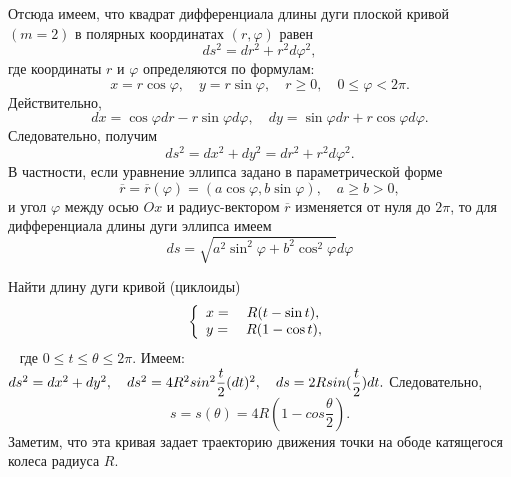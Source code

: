 Отсюда имеем, что квадрат дифференциала длины дуги плоской кривой $(m=2)$ в полярных координатах $(r,\varphi)$ равен
$$ds^2=dr^2+r^2 d\varphi^2,$$
где координаты $r$ и $\varphi$ определяются по формулам:
$$x=r\cos\varphi,\quad y=r\sin\varphi,\quad r\ge0,\quad 0\le\varphi<2\pi.$$
Действительно,
$$dx=\cos\varphi dr - r \sin\varphi d \varphi, \quad dy=\sin\varphi dr + r\cos\varphi d\varphi.$$
\vskip 4mm
Следовательно, получим
\vskip 4mm
$$ds^2 = dx^2 + dy^2 = dr^2 +r^2d\varphi^2.$$
\vskip 4mm
В частности, если уравнение эллипса задано в параметрической форме 
\vskip 3mm
$$\overline{r}=\overline{r}(\varphi)=(a\cos\varphi, b\sin\varphi),\quad a\ge b >0, $$
\vskip 3mm
и угол $\varphi$ между осью $Ox$ и радиус-вектором $\overline{r}$ изменяется от нуля до $2\pi$, то для дифференциала длины дуги эллипса имеем
\vskip 3mm
$$ds = \sqrt{a^2\sin^2\varphi + b^2\cos^2\varphi}d\varphi$$
\vskip 3mm
\begin{example} Найти длину дуги кривой (циклоиды)
\begin{equation}
\left\{
\begin{array}{l}
\displaystyle x= \quad R(t-\sin t), \\
\displaystyle y= \quad R(1- \cos t),
\end{array}
\right.
\end{equation}\
\vskip 3mm
где $0 \le t \le \theta \le 2\pi$. Имеем: $ds^2=dx^2 + dy^2, \quad ds^2=4R^2sin^2\dfrac{t}{2}(dt)^2, \quad ds= \\
2Rsin(\dfrac{t}{2})dt.$ Следовательно,
\vskip 4mm
$$s=s(\theta)=4R(1-cos\dfrac{\theta}{2}).$$
\vskip 4mm
Заметим, что эта кривая задает траекторию движения точки на ободе катящегося колеса радиуса $R$.
\end{example}














